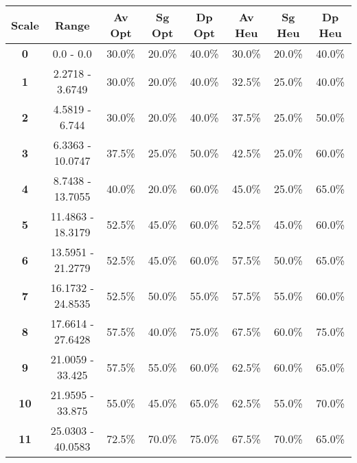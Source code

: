 \begin{tabular}{ | c | c | c | c | c | c | c | c | }
\hline
{\bf Scale} & {\bf Range} & {\bf Av Opt} & {\bf Sg Opt} & {\bf Dp Opt} & {\bf Av Heu} & {\bf Sg Heu} & {\bf Dp Heu}
\\
\hline
{\bf 0} & 0.0 - 0.0 & 30.0\% & 20.0\% & 40.0\% & 30.0\% & 20.0\% & 40.0\% \\ \hline
{\bf 1} & 2.2718 - 3.6749 & 30.0\% & 20.0\% & 40.0\% & 32.5\% & 25.0\% & 40.0\% \\ \hline
{\bf 2} & 4.5819 - 6.744 & 30.0\% & 20.0\% & 40.0\% & 37.5\% & 25.0\% & 50.0\% \\ \hline
{\bf 3} & 6.3363 - 10.0747 & 37.5\% & 25.0\% & 50.0\% & 42.5\% & 25.0\% & 60.0\% \\ \hline
{\bf 4} & 8.7438 - 13.7055 & 40.0\% & 20.0\% & 60.0\% & 45.0\% & 25.0\% & 65.0\% \\ \hline
{\bf 5} & 11.4863 - 18.3179 & 52.5\% & 45.0\% & 60.0\% & 52.5\% & 45.0\% & 60.0\% \\ \hline
{\bf 6} & 13.5951 - 21.2779 & 52.5\% & 45.0\% & 60.0\% & 57.5\% & 50.0\% & 65.0\% \\ \hline
{\bf 7} & 16.1732 - 24.8535 & 52.5\% & 50.0\% & 55.0\% & 57.5\% & 55.0\% & 60.0\% \\ \hline
{\bf 8} & 17.6614 - 27.6428 & 57.5\% & 40.0\% & 75.0\% & 67.5\% & 60.0\% & 75.0\% \\ \hline
{\bf 9} & 21.0059 - 33.425 & 57.5\% & 55.0\% & 60.0\% & 62.5\% & 60.0\% & 65.0\% \\ \hline
{\bf 10} & 21.9595 - 33.875 & 55.0\% & 45.0\% & 65.0\% & 62.5\% & 55.0\% & 70.0\% \\ \hline
{\bf 11} & 25.0303 - 40.0583 & 72.5\% & 70.0\% & 75.0\% & 67.5\% & 70.0\% & 65.0\% \\ \hline
\end{tabular}